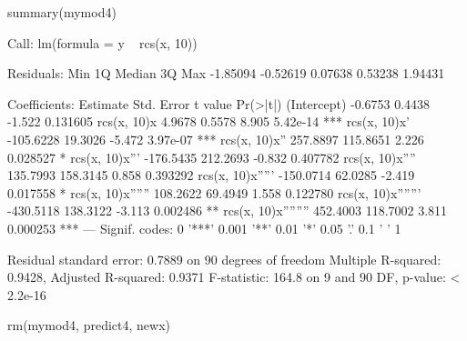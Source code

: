 \begin{Schunk}
\begin{Sinput}
 summary(mymod4)
\end{Sinput}
\begin{Soutput}
Call:
lm(formula = y ~ rcs(x, 10))

Residuals:
     Min       1Q   Median       3Q      Max 
-1.85094 -0.52619  0.07638  0.53238  1.94431 

Coefficients:
                     Estimate Std. Error t value Pr(>|t|)    
(Intercept)           -0.6753     0.4438  -1.522 0.131605    
rcs(x, 10)x            4.9678     0.5578   8.905 5.42e-14 ***
rcs(x, 10)x'        -105.6228    19.3026  -5.472 3.97e-07 ***
rcs(x, 10)x''        257.8897   115.8651   2.226 0.028527 *  
rcs(x, 10)x'''      -176.5435   212.2693  -0.832 0.407782    
rcs(x, 10)x''''      135.7993   158.3145   0.858 0.393292    
rcs(x, 10)x'''''    -150.0714    62.0285  -2.419 0.017558 *  
rcs(x, 10)x''''''    108.2622    69.4949   1.558 0.122780    
rcs(x, 10)x'''''''  -430.5118   138.3122  -3.113 0.002486 ** 
rcs(x, 10)x''''''''  452.4003   118.7002   3.811 0.000253 ***
---
Signif. codes:  0 '***' 0.001 '**' 0.01 '*' 0.05 '.' 0.1 ' ' 1 

Residual standard error: 0.7889 on 90 degrees of freedom
Multiple R-squared: 0.9428,	Adjusted R-squared: 0.9371 
F-statistic: 164.8 on 9 and 90 DF,  p-value: < 2.2e-16 
\end{Soutput}
\begin{Sinput}
 rm(mymod4, predict4, newx)
\end{Sinput}
\end{Schunk}
